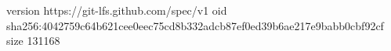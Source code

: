 version https://git-lfs.github.com/spec/v1
oid sha256:4042759c64b621cee0eec75cd8b332adcb87ef0ed39b6ae217e9babb0cbf92cf
size 131168
